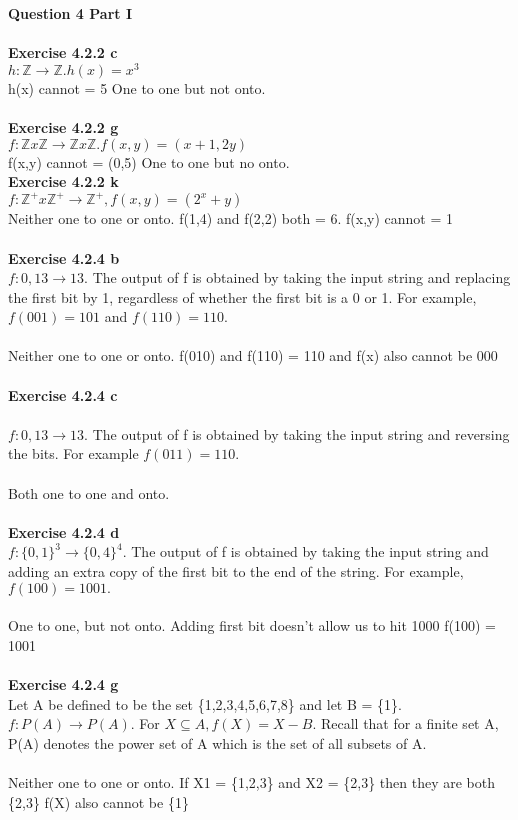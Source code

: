 \documentclass[11pt]{article}
\begin{document}
\newpage

\noindent \textbf{Question 4 Part I}\\\\
\textbf{Exercise 4.2.2 c }\\
$h: \mathbb{Z} \rightarrow \mathbb{Z}. h(x) = x^3$\\
h(x) cannot = 5 One to one but not onto.\\\\
\textbf{Exercise 4.2.2 g }\\
$f: \mathbb{Z} x \mathbb{Z} \rightarrow \mathbb{Z} x \mathbb{Z} . f(x,y) = (x + 1, 2y)$\\
f(x,y) cannot = (0,5) One to one but no onto.\\
\textbf{Exercise 4.2.2 k }\\
$f: \mathbb{Z}^+ x \mathbb{Z}^+ \rightarrow \mathbb{Z}^+ , f(x,y) = (2^x+y)$\\
Neither one to one or onto. f(1,4) and f(2,2) both = 6. f(x,y) cannot = 1 \\\\
\textbf{Exercise 4.2.4 b }\\
$f: 0, 13 \rightarrow 13$. The output of f is obtained by taking the input string and replacing the first bit by 1, regardless of whether the first bit is a 0 or 1. For example, $f(001) = 101$ and $f(110) = 110$.\\\\
Neither one to one or onto. f(010) and f(110) = 110 and f(x) also cannot be 000\\\\
\textbf{Exercise 4.2.4 c }\\\\
$f: 0, 13 \rightarrow 13$. The output of f is obtained by taking the input string and reversing the bits. For example $f(011) = 110$.\\\\
Both one to one and onto. \\\\
\textbf{Exercise 4.2.4 d }\\
$f: \{0,1\}^3 \rightarrow \{0,4\}^4$. The output of f is obtained by taking the input string and adding an extra copy of the first bit to the end of the string. For example, $f(100) = 1001.$\\\\
One to one, but not onto. Adding first bit doesn't allow us to hit 1000 f(100) = 1001\\\\
\textbf{Exercise 4.2.4 g }\\
Let A be defined to be the set \{1,2,3,4,5,6,7,8\} and let B = \{1\}. $f: P(A) \rightarrow P(A)$. For $X \subseteq A, f(X) = X - B$. Recall that for a finite set A, P(A) denotes the power set of A which is the set of all subsets of A.\\\\
Neither one to one or onto. If X1 = \{1,2,3\} and X2 = \{2,3\} then they are both \{2,3\} f(X) also cannot be \{1\}\\\\
\newpage
\end{document}
